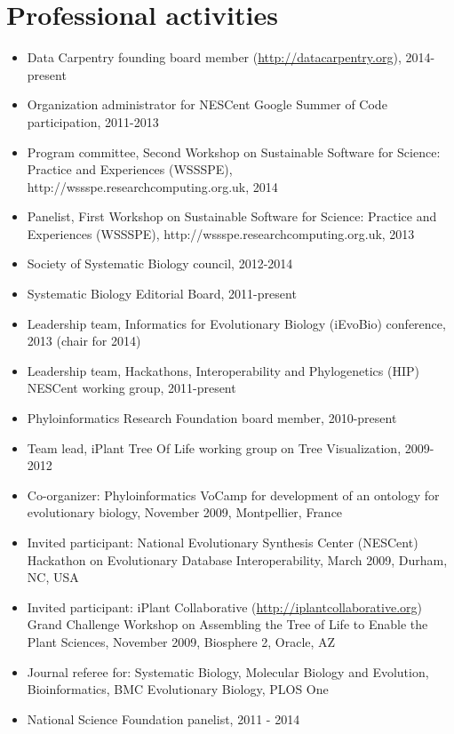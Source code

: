\documentclass[10pt]{article}
\begin{document}
\section*{Professional activities}
\begin{itemize}
\item{Data Carpentry founding board member (\url{http://datacarpentry.org}), 2014-present}
\item{Organization administrator for NESCent Google Summer of Code participation, 2011-2013}
\item{Program committee, Second Workshop on Sustainable Software for Science: Practice and Experiences (WSSSPE), http://wssspe.researchcomputing.org.uk, 2014}
\item{Panelist, First Workshop on Sustainable Software for Science: Practice and Experiences (WSSSPE), http://wssspe.researchcomputing.org.uk, 2013}
\item{Society of Systematic Biology council, 2012-2014}
\item{Systematic Biology Editorial Board, 2011-present}
\item{Leadership team, Informatics for Evolutionary Biology (iEvoBio) conference, 2013 (chair for 2014)}
\item{Leadership team, Hackathons, Interoperability and Phylogenetics (HIP) NESCent working group, 2011-present}
\item{Phyloinformatics Research Foundation board member, 2010-present}
\item{Team lead, iPlant Tree Of Life working group on Tree Visualization, 2009-2012}
\item{Co-organizer: Phyloinformatics VoCamp for development of an ontology for evolutionary biology, November 2009, Montpellier, France}
\item{Invited participant: National Evolutionary Synthesis Center (NESCent) Hackathon on Evolutionary Database Interoperability, March 2009, Durham, NC, USA}
\item{Invited participant: iPlant Collaborative (\url{http://iplantcollaborative.org}) Grand Challenge Workshop on Assembling the Tree of Life to Enable the Plant Sciences, November 2009, Biosphere 2, Oracle, AZ}
\item{Journal referee for: Systematic Biology, Molecular Biology and Evolution, Bioinformatics, BMC Evolutionary Biology, PLOS One}
\item{National Science Foundation panelist, 2011 - 2014}
\end{itemize}
\end{document}
